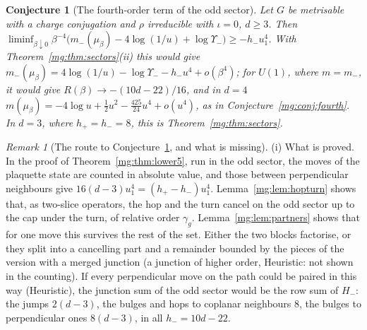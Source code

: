 \documentclass[11pt,a4paper]{article}
\newtheorem{conjecture}[theorem]{Conjecture}
\theoremstyle{definition}
\theoremstyle{remark}
\newtheorem{remark}[theorem]{Remark}
\begin{document}
\begin{conjecture}[The fourth-order term of the odd sector]\label{mg:conj:codd}
Let $G$ be metrisable with a charge conjugation and $\rho$ irreducible with $\iota=0$, $d\ge3$. Then
$\liminf_{\beta\downarrow0}\beta^{-4}\bigl(m_-(\mu_\beta)-4\log(1/u)+\log\Upsilon_-\bigr)\ge-h_-u_1^4$. With Theorem~\ref{mg:thm:sectors}(ii) this would give
$m_-(\mu_\beta)=4\log(1/u)-\log\Upsilon_--h_-u^4+o(\beta^4)$; for $U(1)$, where $m=m_-$, it would give $R(\beta)\to-(10d-22)/16$, and in $d=4$
$m(\mu_\beta)=-4\log u+\frac12u^2-\frac{425}{24}u^4+o(u^4)$, as in Conjecture~\ref{mg:conj:fourth}. In $d=3$, where $h_+=h_-=8$, this is Theorem~\ref{mg:thm:sectors}.
\end{conjecture}

\begin{remark}[The route to Conjecture~\ref{mg:conj:codd}, and what is missing]\label{mg:rem:codd}
(i) What is proved. In the proof of Theorem~\ref{mg:thm:lower5}, run in the odd sector, the moves of the plaquette state are counted in absolute value, and those
between perpendicular neighbours give $16(d-3)u_1^4=(h_+-h_-)u_1^4$. Lemma~\ref{mg:lem:hopturn} shows that, as two-slice operators, the hop and the turn cancel on the odd
sector up to the cap under the turn, of relative order $\gamma_g$. Lemma~\ref{mg:lem:partners} shows that for one move this survives the rest of the set. Either the
two blocks factorise, or they split into a cancelling part and a remainder bounded by the pieces of the version with a merged junction (a junction of higher order, Heuristic:
not shown in the counting). If every perpendicular move on the path could be paired in this way (Heuristic), the junction sum of the odd sector would be the row sum of $H_-$: the jumps $2(d-3)$, the
bulges and hops to coplanar neighbours $8$, the bulges to perpendicular ones $8(d-3)$, in all $h_-=10d-22$.


\end{remark}
\end{document}
